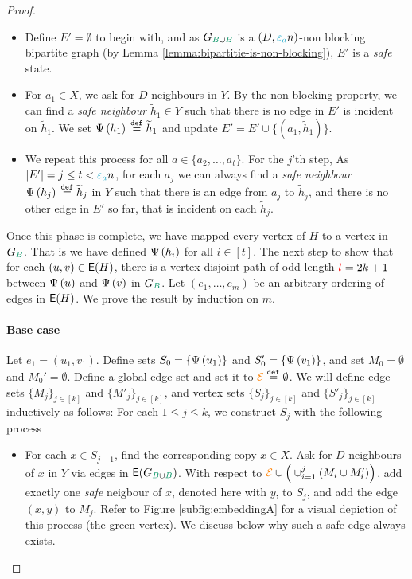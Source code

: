 \documentclass[11pt]{article}
\begin{document}
\begin{proof}
\begin{itemize}
\item Define $E' = \emptyset$ to begin with, and as $\BipartiteG$ is a $(D, \epsilonA n)$-non blocking bipartite graph (by Lemma \ref{lemma:bipartitie-is-non-blocking}), $E'$ is a \emph{safe} state.
  
\item For $a_1 \in X$, we ask for $D$ neighbours in $Y$. By the non-blocking property, we can find a \emph{safe neighbour} $\tilde{h}_1 \in Y$ such that there is no edge in $E'$ is incident on $\tilde{h}_1$. We set $\Psi\left(h_1\right) \text{}\overset{\mathtt{def}}{=} \widetilde{h}_1$ and update $E' = E'  \cup \{(a_1, \tilde{h}_1)\}$.
  
\item We repeat this process for all $a \in \{a_2, \dots, a_t\}$. For the $j$'th step, As $|E'| = j \leq t < \epsilonA n$, for each $a_j$ we can always find a \emph{safe neighbour} $\Psi\left(h_j\right) \text{}\overset{\mathtt{def}}{=} \widetilde{h}_j$ in $Y$ such that there is an edge from $a_j$ to $\tilde{h}_j$, and there is no other edge in $E'$ so far, that is incident on each $\tilde{h}_j$.
  
\end{itemize}

Once this phase is complete, we have mapped every vertex of $H$ to a vertex in $G_{\GreenB}$.
That is we have defined $\Psi\left(h_i\right)$ for all $i \in [t]$.
The next step to show that for each $(u,v) \in \mathsf{E}(H)$, there is a vertex disjoint path of odd length $\textcolor{red}{l} = 2k+1$ between $\Psi\left(u\right)$ and $\Psi\left(v\right)$ in $G_{\GreenB}$.
Let $(e_1, \dots, e_m)$ be an arbitrary ordering of edges in $\mathsf{E}(H)$.
We prove the result by induction on $m$.

\paragraph{Base case} 

Let $e_1 = (u_1,v_1)$. Define sets $S_0 = \{\Psi\left(u_1\right)\}$ and $S'_0 = \{ \Psi\left(v_1\right)\}$, and set $M_0 = \emptyset$ and $M_0' = \emptyset$.
Define a global edge set and set it to $\textcolor{orange}{\mathcal{E}} \text{}\overset{\mathtt{def}}{=} \emptyset$.
We will define edge sets $\{ M_j\}_{j \in [k]}$ and $ \{ M'_j\}_{j \in [k]}$, and vertex sets $\{ S_j\}_{j \in [k]}$ and $\{ S'_j\}_{j \in [k]}$ inductively as follows: For each $1 \leq j \leq k$, we construct $S_{j}$ with the following process

\begin{itemize}
\item {For each $x \in S_{j-1}$, find the corresponding copy $x \in X$. Ask for $D$ neighbours of $x$ in $Y$ via edges in $\Edges{\BipartiteG}$.
    With respect to $\textcolor{orange}{\mathcal{E}} \cup \Big(\cup_{i=1}^{j} (M_i \cup M'_i)\Big)$, add exactly one \emph{safe} neigbour of $x$, denoted here with $y$, to $S_{j}$, and add the edge $(x,y)$ to $M_j$. Refer to Figure \ref{subfig:embeddingA} for a visual depiction of this process (the green vertex).
    We discuss below why such a safe edge always exists.}
  

\end{itemize}
\end{proof}
\end{document}
